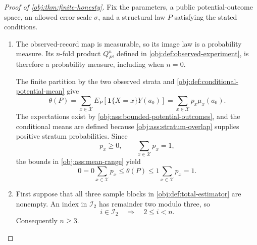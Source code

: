 \begin{proof}[Proof of \cref{obj:thm:finite-honesty}]
Fix the parameters, a public potential-outcome space, an allowed error scale \(\sigma\), and a structural law \(P\) satisfying the stated conditions.

\begin{enumerate}
\item The observed-record map is measurable, so its image law is a probability measure. Its \(n\)-fold product \(Q_P^n\), defined in \cref{obj:def:observed-experiment}, is therefore a probability measure, including when \(n=0\).

The finite partition by the two observed strata and \cref{obj:def:conditional-potential-mean} give
\[
\theta(P)
=\sum_{x\in\mathcal X}E_P[\mathbf1\{X=x\}Y(a_0)]
=\sum_{x\in\mathcal X}p_x\mu_x(a_0).
\]
The expectations exist by \cref{obj:ass:bounded-potential-outcomes}, and the conditional means are defined because \cref{obj:ass:stratum-overlap} supplies positive stratum probabilities. Since
\[
p_x\ge0,\qquad \sum_{x\in\mathcal X}p_x=1,
\]
the bounds in \cref{obj:ass:mean-range} yield
\[
0
=0\sum_{x\in\mathcal X}p_x
\le\theta(P)
\le1\sum_{x\in\mathcal X}p_x
=1.
\]

\item First suppose that all three sample blocks in \cref{obj:def:total-estimator} are nonempty. An index in \(\mathcal I_2\) has remainder two modulo three, so
\[
i\in\mathcal I_2
\quad\Longrightarrow\quad
2\le i<n.
\]
Consequently \(n\ge3\).


\end{enumerate}
\end{proof}
